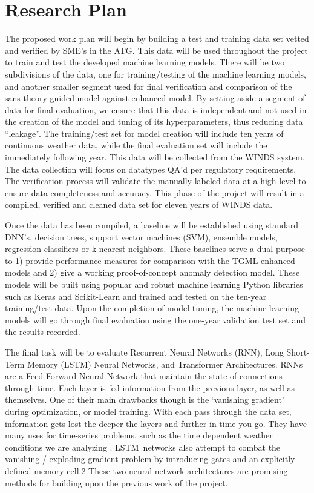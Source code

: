 \section{Research Plan}
\label{sec:researchplan}
The proposed work plan will begin by building a test and training data set vetted and verified by SME’s in the ATG.  This data will be used throughout the project to train and test the developed machine learning models.  There will be two subdivisions of the data, one for training/testing of the machine learning models, and another smaller segment used for final verification and comparison of the sans-theory guided model against enhanced model.  By setting aside a segment of data for final evaluation, we ensure that this data is independent and not used in the creation of the model and tuning of its hyperparameters, thus reducing data “leakage”. The training/test set for model creation will include ten years of continuous weather data, while the final evaluation set will include the immediately following year. This data will be collected from the WINDS system. The data collection will focus on datatypes QA’d per regulatory requirements. The verification process will validate the manually labeled data at a high level to ensure data completeness and accuracy. This phase of the project will result in a compiled, verified and cleaned data set for eleven years of WINDS data.  

Once the data has been compiled, a baseline will be established using standard DNN’s, decision trees, support vector machines (SVM), ensemble models, regression classifiers or k-nearest neighbors.  These baselines serve a dual purpose to 1) provide performance measures for comparison with the TGML enhanced models and 2) give a working proof-of-concept anomaly detection model. These models will be built using popular and robust machine learning Python libraries such as Keras and Scikit-Learn and trained and tested on the ten-year training/test data. Upon the completion of model tuning, the machine learning models will go through final evaluation using the one-year validation test set and the results recorded.

The final task will be to evaluate Recurrent Neural Networks (RNN), Long Short-Term Memory (LSTM) Neural Networks, and Transformer Architectures.  RNNs are a Feed Forward Neural Network that maintain the state of connections through time. Each layer is fed information from the previous layer, as well as themselves.  One of their main drawbacks though is the ‘vanishing gradient’ during optimization, or model training.  With each pass through the data set, information gets lost the deeper the layers and further in time you go.  They have many uses for time-series problems, such as the time dependent weather conditions we are analyzing \cite{elmanFindingStructureTime1990a}. LSTM networks also attempt to combat the vanishing / exploding gradient problem by introducing gates and an explicitly defined memory cell.2  These two neural network architectures are promising methods for building upon the previous work of the project.

